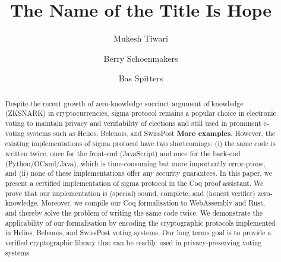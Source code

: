 \documentclass[sigconf]{acmart}
\begin{document}
\title{The Name of the Title Is Hope}


\author{Mukesh Tiwari}

\author{Berry Schoenmakers}


\author{Bas Spitters}

\renewcommand{\shortauthors}{Tiwari et al.}

\begin{abstract}
  Despite the recent growth of zero-knowledge succinct argument 
  of knowledge (ZKSNARK) in cryptocurrencies, 
  sigma protocol remains a popular choice in electronic voting to maintain privacy 
  and verifiability of elections and still used in prominent e-voting systems such as 
  Helios, Belenois, and SwissPost \textbf{More examples}. However, 
  the existing implementations of sigma protocol have two 
  shortcomings: (i) the same code is written twice, once for the front-end (JavaScript)
  and once for the back-end (Python/OCaml/Java), which is time-consuming but more importantly error-prone, 
  and (ii) none of these implementations offer any security guarantees. 
  In this paper, we present a certified implementation of sigma protocol in the Coq proof assistant. 
  We prove that our implementation is (special) sound, complete, and 
  (honest verifier) zero-knowledge. Moreover, 
  we compile our Coq formalisation to WebAssembly and Rust, and 
  thereby solve the problem of writing the same code twice. 
  We demonstrate the applicability of our
  formalisation by encoding the cryptographic protocols implemented in 
  Helios, Belenois, and SwissPost voting systems. 
  Our long terms goal is to provide a verified cryptographic library that can be 
  readily used in privacy-preserving voting systems.


\end{abstract}
\end{document}
